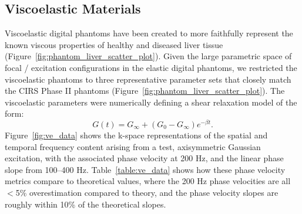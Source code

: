 \subsection{Viscoelastic Materials}
Viscoelastic digital phantoms have been created to more faithfully represent the known viscous properties of healthy and diseased liver tissue (Figure~\ref{fig:phantom_liver_scatter_plot}).  Given the large parametric space of focal / excitation configurations in the elastic digital phantoms, we restricted the viscoelastic phantoms to three representative parameter sets that closely match the CIRS Phase II phantoms (Figure~\ref{fig:phantom_liver_scatter_plot}).  The viscoelastic parameters were numerically defining a shear relaxation model of the form:
\begin{equation}
    G(t) = G_\infty + (G_0 - G_\infty)e^{-\beta t}.
\label{eqn:shear_relaxation}
\end{equation}
Figure~\ref{fig:ve_data} shows the k-space representations of the spatial and
temporal frequency content arising from a test, axisymmetric Gaussian
excitation, with the associated phase velocity at 200 Hz, and the linear phase
slope from 100--400 Hz.  Table~\ref{table:ve_data} shows how these phase
velocity metrics compare to theoretical values, where the 200 Hz phase
velocities are all $<$5\% overestimation compared to theory, and the phase
velocity slopes are roughly within 10\% of the theoretical slopes.

